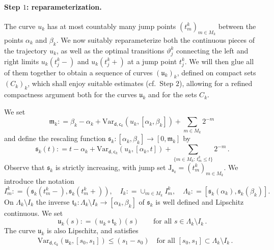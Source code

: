 \documentclass[a4paper,10pt,reqno]{amsart} %
\numberwithin{equation}{section}
\newcommand{\teta}{\vartheta}
\newcommand{\mdn}{\mathsf{d}}
\newcommand{\Vari}[4]{\mathrm{Var}_{#1}(#2,[#3,#4])}
\newcommand{\lli}[2]{{#1}({#2}{-})}
\newcommand{\rli}[2]{{#1}({#2}{+})}
\newcommand{\jump}[1]{\mathrm{J}_{#1}}
\newcommand{\vecostnamep}[1]{\mathsf{c}_{#1}}
\newcommand{\nresc}[1]{\mathfrak{s}_{#1}}
\newcommand{\ninvresc}[1]{\mathfrak{t}_{#1}}
\newcommand{\invcur}[1]{\mathfrak{u}_{#1}}
\newcommand{\newmresc}[1]{\mathfrak{m}_{#1}}
\newcommand{\RRRN}{\color{blue}}
\begin{document}
\paragraph{\bf Step $1$: reparameterization.}
The curve $u_k$ has at most countably many jump points $(t_m^k)_{m\in M_k}$ between the points $\alpha_k$ and $\beta_k$.
 We now suitably reparameterize both the continuous pieces of the trajectory $u_k$, as well as the optimal transitions 
$\teta_j^k$ connecting the left and right limits $\lli {u_k}{t_j^k}$ and  $\rli {u_k}{t_j^k}$ at a jump point $t_j^k$. We will then glue all of them together to obtain a sequence of curves $(\invcur k)_k$, defined on  compact sets $(C_k)_k$,  which shall enjoy suitable estimates (cf.\ Step $2$), allowing for a refined compactness argument both for the curves $\invcur k $ and for the sets $C_k$. 
\par
We set 
\[
\newmresc k: = \beta_k -\alpha_k +  \Vari{\mdn,\vecostnamep k}{u_{k}}{\alpha_k}{\beta_k}+ \sum_{m \in M_k} 2^{-m}\,
\]
and define the  rescaling function $\nresc k : [\alpha_k, \beta_k]\to [0,\newmresc k]$   by 
 \[
 \nresc k(t): 
 = t-\alpha_k +    \Vari{\mdn,\vecostnamep k}{u_{k}}{\alpha_k}{t}+ \sum_{\{m \in M_k :\, t_m^k \leq t\}} 2^{-m}\,.
 \]
 Observe that $\nresc k $ is strictly increasing, with jump set $\jump{\nresc k} = (t_m^k)_{m\in M_k}$. We  introduce the notation
 \[
 I_m^k: =  (\nresc k(t_m^k-), \nresc k(t_m^k+)),
  \quad I_k: = \cup_{m\in M_k}  I_m^k, \quad  \Lambda_k: =[ \nresc k (\alpha_k), \nresc k (\beta_k)]. 
 \]
 On   $\Lambda_k\setminus I_k$ 
    the inverse $\ninvresc k: \Lambda_k \setminus I_k \to [\alpha_k, \beta_k]$ 
    of $\nresc k $ 
    is well defined and Lipschitz continuous. We set
    \begin{equation}
    \label{invcurk-1}
    \invcur k (s): = (u_k \circ \ninvresc k)(s) \qquad \text{for all } s \in \Lambda_k \setminus I_k\,.
    \end{equation}
    The curve $\invcur k$ is also Lipschitz, and satisfies
    \begin{equation}
    \label{est-bv-invcur}
    \begin{aligned}
    &
     \Vari{\mdn,\vecostnamep k}{\invcur k}{s_0}{s_1} \leq (s_1{-}s_0) \quad \text{for all } [s_0,s_1]\subset \Lambda_k \setminus I_k\,.
     \end{aligned}
    \end{equation}
\end{document}
